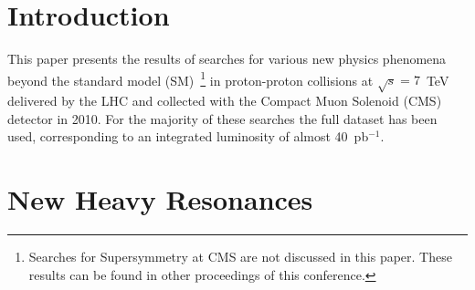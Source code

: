 \documentclass[11pt]{article}
\def\sqrts {$\sqrt{s}=7$~TeV\xspace}
\def\pp{proton-proton\xspace}
\def\Zprime{Z$^\prime$\xspace}
\def\Wprime{W$^\prime$\xspace}
\def\pb{pb$^{-1}$\xspace}
\begin{document}
\section{Introduction}
This paper presents the results of searches for various new physics 
phenomena beyond the standard model (SM)~\footnote{Searches for Supersymmetry at CMS are not 
discussed in this paper. These results can be found in other 
proceedings of this conference.} in \pp collisions 
at \sqrts delivered by the LHC and collected with the 
Compact Muon Solenoid (CMS)~\cite{CMSJINST} detector in 2010. 
For the majority of these searches the full dataset has been used, 
corresponding to an integrated luminosity of almost 40~\pb. 


\section{New Heavy Resonances}\label{sec:resonances}
\end{document}
